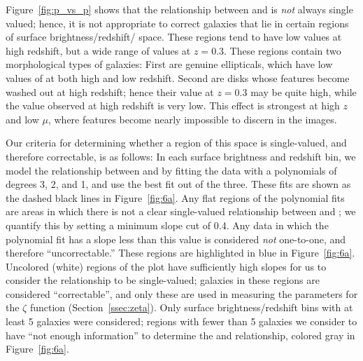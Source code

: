 \documentclass[usenatbib]{mn2e}
\begin{document}
Figure~\ref{fig:p_vs_p} shows that the relationship between \pfeaturesz{} and \pfeaturesrest{} is \emph{not} always single valued; hence, it is not appropriate to correct galaxies that lie in certain regions of surface brightness/redshift/\pfeatures{} space. These regions tend to have low \pfeatures{} values at high redshift, but a wide range of values at $z=0.3$. These regions contain two morphological types of galaxies: First are genuine ellipticals, which have low values of \pfeatures{} at both high and low redshift. Second are disks whose features become washed out at high redshift; hence their \pfeatures{} value at $z=0.3$ may be quite high, while the value observed at high redshift is very low. This effect is strongest at high $z$ and low $\mu$, where features become nearly impossible to discern in the images.

Our criteria for determining whether a region of this space is single-valued, and therefore correctable, is as follows: In each surface brightness and redshift bin, we model the relationship between \pfeaturesz{} and \pfeaturesrest{} by fitting the data with a polynomials of degrees 3, 2, and 1, and use the best fit out of the three. These fits are shown as the dashed black lines in Figure~\ref{fig:6a}. Any flat regions of the polynomial fits are areas in which there is not a clear single-valued relationship between \pfeaturesz{} and \pfeaturesrest; we quantify this by setting a minimum slope cut of 0.4. Any data in which the polynomial fit has a slope less than this value is considered \emph{not} one-to-one, and therefore ``uncorrectable.'' These regions are highlighted in blue in Figure~\ref{fig:6a}. Uncolored (white) regions of the plot have sufficiently high slopes for us to consider the relationship to be single-valued; galaxies in these regions are considered ``correctable'', and only these are used in measuring the parameters for the $\zeta$ function (Section~\ref{ssec:zeta}). Only surface brightness/redshift bins with at least 5 galaxies were considered; regions with fewer than 5 galaxies we consider to have ``not enough information'' to determine the \pfeaturesz{} and \pfeaturesrest{} relationship, colored gray in Figure~\ref{fig:6a}.
\end{document}
